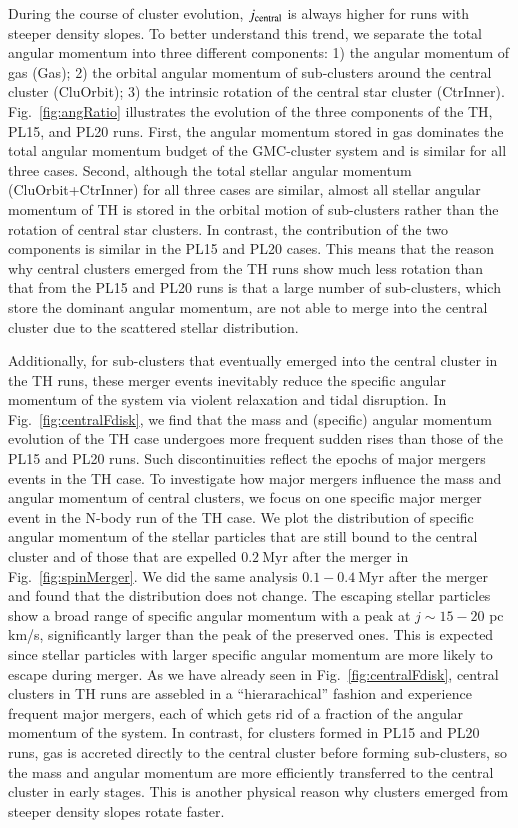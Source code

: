 \documentclass[fleqn,usenatbib]{mnras}
\begin{document}
During the course of cluster evolution, $j_{\rm central}$ is always higher for runs with steeper density slopes.
To better understand this trend, we separate the total angular momentum into three different components: 1) the angular momentum of gas (Gas); 2) the orbital angular momentum of sub-clusters around the central cluster (CluOrbit); 3) the intrinsic rotation of the central star cluster (CtrInner).
Fig.~\ref{fig:angRatio} illustrates the evolution of the three components of the TH, PL15, and PL20 runs.
First, the angular momentum stored in gas dominates the total angular momentum budget of the GMC-cluster system and is similar for all three cases.
Second, although the total stellar angular momentum (CluOrbit+CtrInner) for all three cases are similar, almost all stellar angular momentum of TH is stored in the orbital motion of sub-clusters rather than the rotation of central star clusters.
In contrast, the contribution of the two components is similar in the PL15 and PL20 cases.
This means that the reason why central clusters emerged from the TH runs show much less rotation than that from the PL15 and PL20 runs is that a large number of sub-clusters, which store the dominant angular momentum, are not able to merge into the central cluster due to the scattered stellar distribution.

Additionally, for sub-clusters that eventually emerged into the central cluster in the TH runs, these merger events inevitably reduce the specific angular momentum of the system via violent relaxation and tidal disruption.
In Fig.~\ref{fig:centralFdisk}, we find that the mass and (specific) angular momentum evolution of the TH case undergoes more frequent sudden rises than those of the PL15 and PL20 runs.
Such discontinuities reflect the epochs of major mergers events in the TH case.
To investigate how major mergers influence the mass and angular momentum of central clusters, we focus on one specific major merger event in the N-body run of the TH case.
We plot the distribution of specific angular momentum of the stellar particles that are still bound to the central cluster and of those that are expelled $0.2\ \mathrm{Myr}$ after the merger in Fig.~\ref{fig:spinMerger}. We did the same analysis $0.1-0.4\ \mathrm{Myr}$ after the merger and found that the distribution does not change.
The escaping stellar particles show a broad range of specific angular momentum with a peak at $j\sim15-20$ pc km/s, significantly larger than the peak of the preserved ones. This is expected since stellar particles with larger specific angular momentum are more likely to escape during merger.
As we have already seen in Fig.~\ref{fig:centralFdisk}, central clusters in TH runs are assebled in a ``hierarachical'' fashion and experience frequent major mergers, each of which gets rid of a fraction of the angular momentum of the system.
In contrast, for clusters formed in PL15 and PL20 runs, gas is accreted directly to the central cluster before forming sub-clusters, so the mass and angular momentum are more efficiently transferred to the central cluster in early stages.
This is another physical reason why clusters emerged from steeper density slopes rotate faster.
\end{document}
